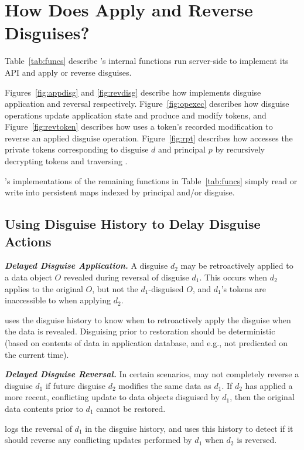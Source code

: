 \section{How Does \sys Apply and Reverse Disguises?}

Table~\ref{tab:funcs} describe \sys's internal functions run server-side to implement its API 
and apply or reverse disguises. 

Figures~\ref{fig:appdisg} and \ref{fig:revdisg} describe how \sys implements disguise application and
reversal respectively. Figure~\ref{fig:opexec} describes how disguise operations update application
state and produce and modify tokens, and 
Figure~\ref{fig:revtoken} describes how \sys uses a token's recorded
modification to reverse an applied disguise operation. 
Figure~\ref{fig:rpt} describes how \sys accesses the private tokens
corresponding to disguise $d$ and principal $p$ by recursively decrypting tokens and traversing
.

\sys's implementations of the remaining functions in Table~\ref{tab:funcs} simply read or write into
persistent maps indexed by principal and/or disguise.

\subsection{Using Disguise History to Delay Disguise Actions}

\noindent\textbf{\emph{Delayed Disguise Application.}}
A disguise $d_2$ may be retroactively applied to a data object $O$ revealed during reversal of
disguise $d_1$.  This occurs when $d_2$ applies to the original $O$, but not the $d_1$-disguised
$O$, and $d_1$'s tokens are inaccessible to \sys when applying $d_2$.

\sys uses the disguise history to know when to retroactively apply the
disguise when the data is revealed.  Disguising prior to restoration should be deterministic (based
on contents of data in application database, and e.g., not predicated on the current time).

\vspace{6pt}\noindent\textbf{\emph{Delayed Disguise Reversal.}}
In certain scenarios, \sys may not completely reverse a disguise $d_1$ if future disguise $d_2$
modifies the same data as $d_1$. If $d_2$ has applied a more recent, conflicting update to data
objects disguised by $d_1$, then the original data contents prior to $d_1$ cannot be restored. 

\sys logs the reversal of $d_1$ in the disguise history, and uses this history to detect if it
should reverse any conflicting updates performed by $d_1$ when $d_2$ is reversed.

